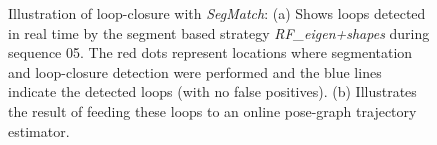 \begin{figure}[!tbp]
\begin{minipage}[b]{0.4\textwidth}
  \end{minipage}
  \caption{Illustration of loop-closure with \textit{SegMatch}: (a) Shows loops detected in real time by the segment based strategy \textit{RF\_eigen+shapes} during sequence 05. The red dots represent locations where segmentation and loop-closure detection were performed and the blue lines indicate the detected loops (with no false positives). (b) Illustrates the result of feeding these loops to an online pose-graph trajectory estimator.}
  \label{fig:corrected}
\end{figure}


